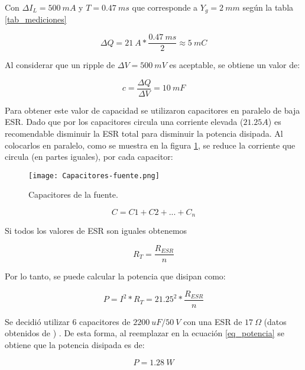 \noindent Con $\Delta I_L=500 \:mA$ y $T=0.47\:ms$ que corresponde a $Y_g = 2 \:mm$ según la tabla \ref{tab_mediciones}

\begin{equation} 
\Delta Q = 21\:A * \frac{0.47\:ms}{2} \approx 5\:mC
\end{equation}

\noindent Al considerar que un ripple de $\Delta V=500 \:mV$ es aceptable, se obtiene un valor de:

\begin{equation} 
	c = \frac{\Delta Q}{\Delta V} = 10 \:mF
\end{equation}

\noindent Para obtener este valor de capacidad se utilizaron capacitores en paralelo de baja ESR. Dado que por los capacitores circula una corriente elevada ($21.25 A$) es recomendable disminuir la ESR total para disminuir la potencia disipada. Al colocarlos en paralelo, como se muestra en la figura \ref{fig:img_capacitores-fuente}, se reduce la corriente que circula (en partes iguales), por cada capacitor:


\begin{figure}[H]
	\centering
	\texttt{[image: Capacitores-fuente.png]}
	\caption{Capacitores de la fuente.}
	\label{fig:img_capacitores-fuente}
\end{figure}


\begin{equation} 
	C = C1 + C2 + ... + C_n
\end{equation}


\noindent Si todos los valores de ESR son iguales obtenemos

\begin{equation} 
R_T = \frac{R_{ESR}}{n}
\end{equation}

\noindent Por lo tanto, se puede calcular la potencia que disipan como:

\begin{equation}\label{eq_potencia} 
	P = I^2 * R_T = 21.25^2 * \frac{R_{ESR}}{n}
\end{equation}

\noindent Se decidió utilizar 6 capacitores  de $2200 \:uF/50\:V$ con una ESR de $17 \:\Omega$ (datos obtenidos de \cite{EKY-350ELL222MM25S}) . De esta forma, al reemplazar en la ecuación \ref{eq_potencia} se obtiene que la potencia disipada es de: 

\begin{equation} 
	P=1.28\:W
\end{equation}


